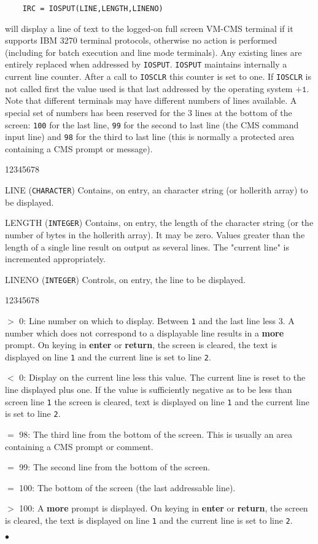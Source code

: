 \begin{verbatim}
    IRC = IOSPUT(LINE,LENGTH,LINENO)
\end{verbatim}
will display a line of text to the logged-on full screen VM-CMS
terminal if it supports IBM 3270 terminal protocols, otherwise no
action is performed (including for batch execution and line mode
terminals). Any existing lines are entirely replaced when addressed
by {\tt IOSPUT}. {\tt IOSPUT} maintains internally a current line
counter. After a call to {\tt IOSCLR} this counter is set to one.
If {\tt IOSCLR} is not called first the value used is that last
addressed by the operating system $\mathtt{+1}$. Note that different
terminals may have different numbers
of lines available. A special set of numbers has been reserved for the
3 lines at the bottom of the screen: {\tt 100} for the last line,
{\tt 99} for the second to last line (the CMS command input line) and
{\tt 98} for the third to last line (this is normally a protected area
containing a CMS prompt or message).
\begin{DLtt}{12345678}
\item[LINE] ({\tt CHARACTER}) Contains, on entry, an character string
(or hollerith array) to be displayed.
\item[LENGTH] ({\tt INTEGER}) Contains, on entry, the length of
the character string (or the number of bytes in the hollerith array).
It may be zero. Values greater than the length of a single line
result on output as several lines. The "current line" is incremented
appropriately.
\item[LINENO] ({\tt INTEGER}) Controls, on entry,  the line to be
displayed.
\begin{DLtt}{12345678}
\item[$>$ 0:] Line number on which to display. Between
{\tt 1} and the last line less 3. A number which does not
correspond to a displayable line results in a {\bf more} prompt.
On keying in {\bf enter} or {\bf return}, the screen is cleared,
the text is displayed on line {\tt 1} and the current line is set to
line {\tt 2}.
\item[$<$ 0:] Display on the current line less this value. The
current line is reset to the line displayed plus one. If the
value is sufficiently negative as to be less than screen line {\tt 1}
the screen is cleared, text is displayed on line {\tt 1} and the current
line is set to line {\tt 2}.
\item[$=$ 98:] The third line from the bottom of the screen. This is
usually an  area containing a CMS prompt or comment.
\item[$=$ 99:] The second line from the bottom of the screen.
\item[$=$ 100:] The bottom of the screen (the last addressable line).
\item[$>$ 100:] A {\bf more} prompt is displayed. On keying in
{\bf enter} or {\bf return}, the screen is cleared, the text is
displayed on line {\tt 1} and the current line is set to line {\tt 2}.
\end{DLtt}
\end{DLtt}
$\bullet$
